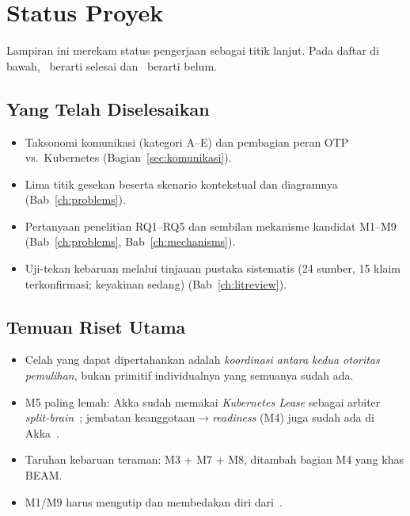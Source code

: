 \chapter{Status Proyek}
\label{ch:status}

Lampiran ini merekam status pengerjaan sebagai titik lanjut. Pada daftar di bawah,
\cbdone\ berarti selesai dan \cbtodo\ berarti belum.

\section{Yang Telah Diselesaikan}
\begin{itemize}[leftmargin=2.2em,nosep]
  \item[\cbdone] Taksonomi komunikasi (kategori A--E) dan pembagian peran OTP vs.\
        Kubernetes (Bagian~\ref{sec:komunikasi}).
  \item[\cbdone] Lima titik gesekan beserta skenario kontekstual dan diagramnya
        (Bab~\ref{ch:problems}).
  \item[\cbdone] Pertanyaan penelitian RQ1--RQ5 dan sembilan mekanisme kandidat
        M1--M9 (Bab~\ref{ch:problems}, Bab~\ref{ch:mechanisms}).
  \item[\cbdone] Uji-tekan kebaruan melalui tinjauan pustaka sistematis (24 sumber,
        15 klaim terkonfirmasi; keyakinan sedang) (Bab~\ref{ch:litreview}).
\end{itemize}

\section{Temuan Riset Utama}
\begin{itemize}[leftmargin=1.4em,nosep]
  \item Celah yang dapat dipertahankan adalah \emph{koordinasi antara kedua otoritas
        pemulihan}, bukan primitif individualnya yang semuanya sudah ada.
  \item M5 paling lemah: Akka sudah memakai \emph{Kubernetes Lease} sebagai arbiter
        \emph{split-brain}~\cite{akkaLease}; jembatan keanggotaan$\rightarrow$\emph{readiness}
        (M4) juga sudah ada di Akka~\cite{akkaHealth}.
  \item Taruhan kebaruan teraman: M3 + M7 + M8, ditambah bagian M4 yang khas BEAM.
  \item M1/M9 harus mengutip dan membedakan diri dari~\cite{roberts2025}.
\end{itemize}

